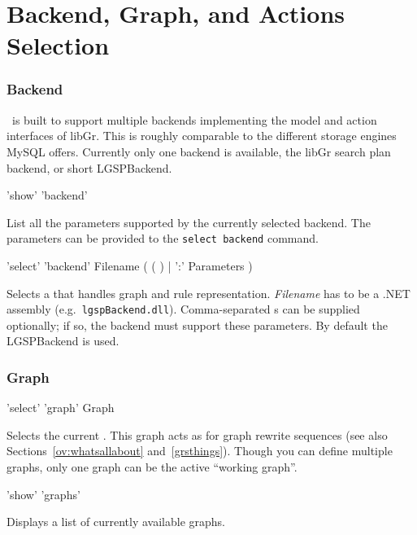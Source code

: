 \section{Backend, Graph, and Actions Selection}\label{backend}

\subsubsection*{Backend}
\GrG\ is built to support multiple backends implementing the model and action interfaces of libGr.
This is roughly comparable to the different storage engines MySQL offers.
Currently only one backend is available, the libGr search plan backend, or short LGSPBackend.

\begin{rail}
  'show' 'backend'
\end{rail}\nopagebreak{}
List all the parameters supported by the currently selected backend.
The parameters can be provided to the \texttt{select backend} command.

\begin{rail}
  'select' 'backend' Filename ( ( ) | ':' Parameters )
\end{rail}
Selects a  that handles graph and rule representation.
\emph{Filename} has to be a .NET assembly (e.g.\ \texttt{lgspBackend.dll}).
Comma-separated s can be supplied optionally; if so, the backend must support these parameters.
By default the LGSPBackend is used.


\subsubsection*{Graph}

\begin{rail}
  'select' 'graph' Graph
\end{rail}
Selects the current .
This graph acts as \emph{} for graph rewrite sequences (see also Sections~\ref{ov:whatsallabout} and~\ref{grsthings}).
Though you can define multiple graphs, only one graph can be the active ``working graph''.

\begin{rail}
  'show' 'graphs'
\end{rail}
Displays a list of currently available graphs.

